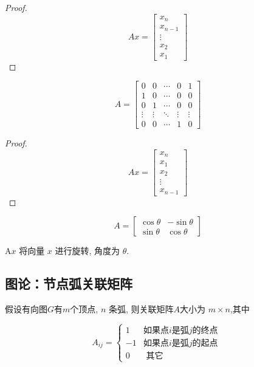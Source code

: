 \begin{proof}
    $$ A x=\left[\begin{array}{c}x_{n} \\ x_{n-1} \\ \vdots \\ x_{2} \\ x_{1}\end{array}\right] $$
\end{proof}

\begin{example}[循环移位矩阵]
    $$ A=\left[\begin{array}{ccccc}0 & 0 & \cdots & 0 & 1 \\ 1 & 0 & \cdots & 0 & 0 \\ 0 & 1 & \cdots & 0 & 0 \\ \vdots & \vdots & \ddots & \vdots & \vdots \\ 0 & 0 & \cdots & 1 & 0\end{array}\right] $$
\end{example}

\begin{proof}
    $$ A x=\left[\begin{array}{c}x_{n} \\ x_{1} \\ x_{2} \\ \vdots \\ x_{n-1}\end{array}\right] $$
\end{proof}

\begin{example}[旋转矩阵]
    $$ A=\left[\begin{array}{cc}\cos \theta & -\sin \theta \\ \sin \theta & \cos \theta\end{array}\right] $$

    $ \mathrm{A} x $ 将向量 $ x $ 进行旋转, 角度为 $ \theta $.
\end{example}

\subsection{图论：节点弧关联矩阵}

\begin{definition}[关联矩阵]
   假设有向图$G$有$m$个顶点,  $ n $ 条弧, 则关联矩阵$A$大小为 $ m \times n $,其中 

   $$ A_{i j}=\left\{\begin{array}{ll}1 & \text{如果点} i \text{是弧} j \text{的终点 } \\ -1 & \text {如果点}i \text{是弧}j \text{的起点} \\ 0 & \text { 其它 }\end{array}\right. $$
\end{definition}

